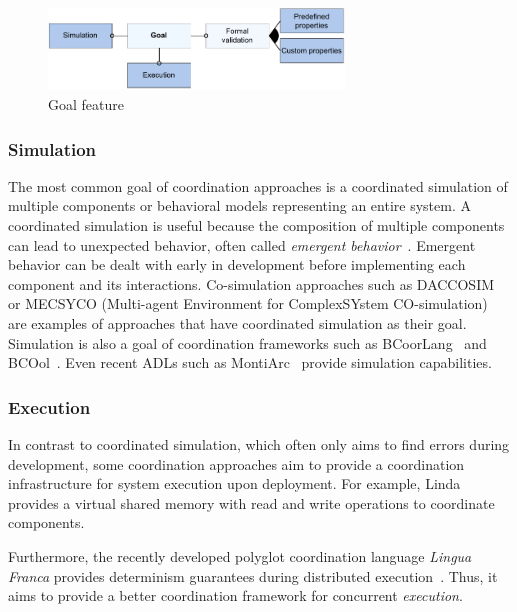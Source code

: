 \documentclass[runningheads]{llncs}
\begin{document}
\begin{figure}[ht]
	\centering
	\includegraphics[width=0.7\textwidth]{images/goal_feature}
	\caption{Goal feature}
	\label{fig: goalFeature}
\end{figure}

\subsubsection{Simulation} The most common goal of coordination approaches is a coordinated simulation of multiple components or behavioral models representing an entire system.
A coordinated simulation is useful because the composition of multiple components can lead to unexpected behavior, often called \textit{emergent behavior}~\cite{ekerTamingHeterogeneityPtolemy2003}.
Emergent behavior can be dealt with early in development before implementing each component and its interactions.
Co-simulation approaches such as DACCOSIM~\cite{galtierFMIBasedDistributedMultisimulation2015,dadSynthesisFeedbackDistribution2021} or MECSYCO (Multi-agent Environment for ComplexSYstem CO-simulation)~\cite{camusHybridCosimulationFMUs2016,camusCosimulationCyberphysicalSystems2018} are examples of approaches that have coordinated simulation as their goal.
Simulation is also a goal of coordination frameworks such as BCoorLang~\cite{krauterBehavioralConsistencyMultimodeling2023} and BCOol~\cite{varalarsenBehavioralCoordinationOperator2015}.
Even recent ADLs such as MontiArc~\cite{haberMontiArcArchitecturalModeling2014} provide simulation capabilities.

\subsubsection{Execution} In contrast to coordinated simulation, which often only aims to find errors during development, some coordination approaches aim to provide a coordination infrastructure for system execution upon deployment.
For example, Linda provides a virtual shared memory with read and write operations to coordinate components.

Furthermore, the recently developed polyglot coordination language \textit{Lingua Franca} provides determinism guarantees during distributed execution~\cite{lohstrohLinguaFrancaDeterministic2021}.
Thus, it aims to provide a better coordination framework for concurrent \textit{execution}.
\end{document}
